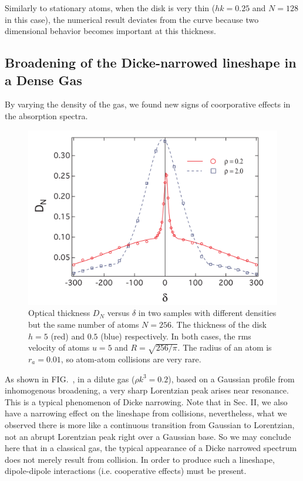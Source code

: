 Similarly to stationary atoms, when the disk is very thin ($hk=0.25$ and $N=128$ in this case), the numerical result deviates from the curve because two dimensional behavior becomes important at this thickness.

\subsection{Broadening of the Dicke-narrowed lineshape in a Dense Gas}

By varying the density of the gas, we found new signs of coorporative effects in the absorption spectra.

\begin{figure}[h!]
\begin{center}
\includegraphics[width=\textwidth]{DICKE.pdf}
\end{center}
\caption{Optical thickness $D_N$ versus $\delta$ in two samples with different densities but the same number of atoms $N=256$. The thickness of the disk $h=5$ (red) and $0.5$ (blue) respectively. In both cases, the rms velocity of atoms $u=5$ and $R=\sqrt{256/\pi}$. The radius of an atom is $r_a=0.01$, so atom-atom collisions are very rare.}
\label{DICKE}
\end{figure}

As shown in FIG.~,  in a dilute gas ($\rho k^3=0.2$), based on a Gaussian profile from inhomogenous broadening, a very sharp Lorentzian peak arises near resonance. This is a typical phenomenon of Dicke narrowing. Note that in Sec. II, we also have a narrowing effect on the lineshape from collisions, nevertheless, what we observed there is more like a continuous transition from Gaussian to Lorentzian, not an abrupt Lorentzian peak right over a Gaussian base. So we may conclude here that in a classical gas, the typical appearance of a Dicke narrowed spectrum does not merely result from collision. In order to produce such a lineshape, dipole-dipole interactions (i.e. cooperative effects) must be present.

